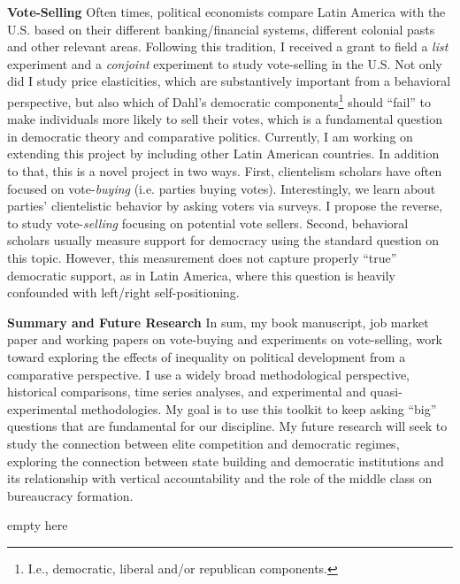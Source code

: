 \documentclass[11pt]{letter} %
\begin{document}
\begin{letter}{}
{\bf Vote-Selling} Often times, political economists compare Latin America with the U.S. based on their different banking/financial systems, different colonial pasts and other relevant areas. Following this tradition, I received a grant to field a \emph{list} experiment and a \emph{conjoint} experiment to study vote-selling in the U.S. Not only did I study price elasticities, which are substantively important from a behavioral perspective, but also which of Dahl's democratic components\footnote{I.e., democratic, liberal and/or republican components.} should ``fail'' to make individuals more likely to sell their votes, which is a fundamental question in democratic theory and comparative politics. Currently, I am working on extending this project by including other Latin American countries. In addition to that, this is a novel project in two ways. First, clientelism scholars have often focused on vote-\emph{buying} (i.e. parties buying votes). Interestingly, we learn about parties' clientelistic behavior by asking voters via surveys. I propose the reverse, to study vote-\emph{selling} focusing on potential vote sellers. Second, behavioral scholars usually measure support for democracy using the standard question on this topic. However, this measurement does not capture properly ``true'' democratic support, as in Latin America, where this question is heavily confounded with left/right self-positioning. 

{\bf Summary and Future Research} In sum, my book manuscript, job market paper and working papers on vote-buying and experiments on vote-selling, work toward exploring the effects of inequality on political development from a comparative perspective. I use a widely broad methodological perspective, historical comparisons, time series analyses, and experimental and quasi-experimental methodologies. My goal is to use this toolkit to keep asking ``big'' questions that are fundamental for our discipline. My future research will seek to study the connection between elite competition and democratic regimes, exploring the connection between state building and democratic institutions and its relationship with vertical accountability and the role of the middle class on bureaucracy formation.

\closing{{\color{white}empty here}}




\end{letter}
\end{document}
